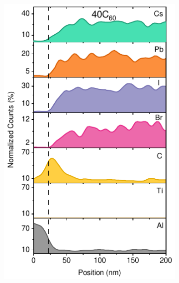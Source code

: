 \begin{figure}[htbp]
\begin{subfigure}{0.32\textwidth}
        \includegraphics[width=\textwidth]{chapters/transport_layers/images/TEM_40C60.pdf}
        \caption{}
        \label{}
    \end{subfigure}
    \hfill
    \begin{subfigure}{0.32\textwidth}
        \centering

\end{subfigure}
\end{figure}
